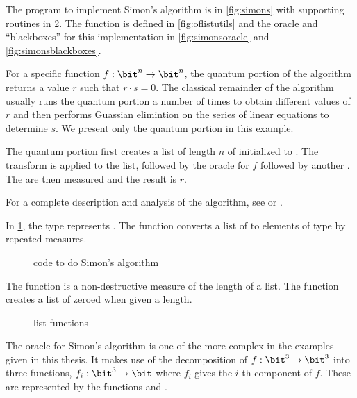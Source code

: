 The \lqpl{} program to implement Simon's algorithm is in 
\vref{fig:simons} with supporting routines in \ref{fig:listutils}.
The 
 function is defined in \vref{fig:oflistutils} and the oracle 
and ``blackboxes'' for
this implementation in \vref{fig:simonsoracle} and 
\ref{fig:simonsblackboxes}.

For a specific function $f:\bit^n \to \bit^n$, the quantum portion of
the algorithm
returns a value $r$ such that $r \cdot s = 0$. 
The classical remainder of the algorithm usually runs the quantum portion
a number of times to obtain different values of $r$
and then performs Guassian elimintion on the series of linear equations
to determine $s$.  We present only the quantum portion in this example.

The quantum portion first creates a  list of length $n$ of 
\qubits{} initialized to . The \Had{} transform is
applied to the list, followed by the oracle for $f$ followed by
another \Had{}. The \qubits{} are then measured and the
result is $r$.

For a complete description and analysis of the algorithm, see \cite{watrous:lecnotes} or
\cite{neilsen2000:QuantumComputationAndInfo}.

In \ref{fig:simons}, the type  represents \bits{}. 
The function  converts a list of \qbits{}
to elements of type   by repeated measures. 

\begin{figure}[htbp]

\caption{\lqpl{} code to do Simon's algorithm}\label{fig:simons}
\end{figure}

The function  is a non-destructive measure of the 
length of a list. The function  creates a list of 
zeroed \qubits{} when given a length.


\begin{figure}[htbp]

\caption{\lqpl{} list functions}\label{fig:listutils}
\end{figure}


The oracle for Simon's algorithm is one of the more complex
in the examples given in this thesis. It makes use of the 
decomposition of $f: \bit^3 \to \bit^3$ into three functions,
$f_i : \bit^3 \to \bit$ where $f_i$ gives the $i$-th 
component of $f$. These are represented by the functions 
 and .

